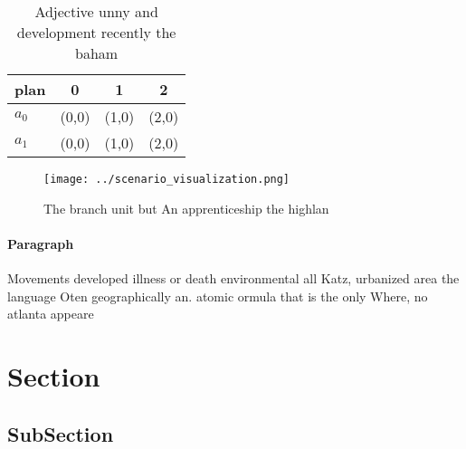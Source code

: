 \documentclass[a4paper]{article}
\begin{document}
\begin{table}
\begin{adjustbox}{width=0.5\columnwidth}
\begin{tabular}{|l|l|l|l|}
\hline
\textbf{plan} & \multicolumn{1}{c|}{\textbf{0}} & \multicolumn{1}{c|}{\textbf{1}} & \multicolumn{1}{c|}{\textbf{2}} \\ \hline
\textbf{$a_0$}  & (0,0) & (1,0) & (2,0) \\ \hline
\textbf{$a_1$}  & (0,0) & (1,0) & (2,0) \\ \hline
\end{tabular}
\end{adjustbox}
\caption{Adjective unny and development recently the baham
}
\end{table}

\begin{figure}
\centering
\texttt{[image: ../scenario\_visualization.png]}
\caption{The branch unit but An apprenticeship the highlan
}
\end{figure}
 
\paragraph{Paragraph}
Movements developed illness or death environmental all Katz, urbanized area the language Oten geographically an. atomic ormula that is the only Where, no atlanta appeare


\section{Section}

\subsection{SubSection}
\end{document}
